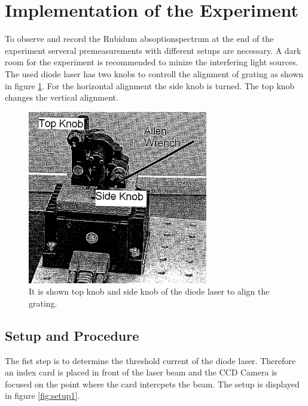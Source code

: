 \section{Implementation of the Experiment}
\label{sec:Durchführung}
To observe and record the Rubidum absoptionspectrum at the end
of the experiment
serveral premeasurements with different setups are necessary.
A dark room for the experiment is recommended to minize the
interfering light sources.
The used diode laser has two knobs to controll the alignment of grating
as shown in figure \ref{fig:knobs}.
For the horizontal alignment the side knob is turned. The
top knob changes the vertical alignment.
\begin{figure}
  \centering
  \includegraphics[width=0.7\textwidth]{Laserknobs.png}
  \caption{It is shown top knob and side knob of the diode laser to align the grating.\cite{V61}}
  \label{fig:knobs}
\end{figure}


\subsection{Setup and Procedure}
\label{subsec:setup}
The fist step is to determine the threshold current
of the diode laser.
Therefore an index card is placed in front of the laser beam and the CCD Camera
is focused on the point where the card intercpets the beam.
The setup is displayed
in figure \ref{fig:setup1}.

